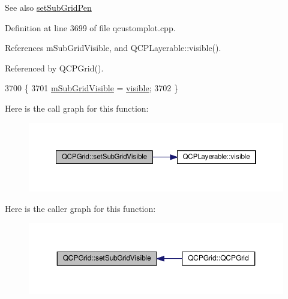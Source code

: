 \begin{DoxySeeAlso}{See also}
\hyperlink{class_q_c_p_grid_a9edd3593f384d1f0b0202a39cef4453d}{set\+Sub\+Grid\+Pen} 
\end{DoxySeeAlso}


Definition at line 3699 of file qcustomplot.\+cpp.



References m\+Sub\+Grid\+Visible, and Q\+C\+P\+Layerable\+::visible().



Referenced by Q\+C\+P\+Grid().


\begin{DoxyCode}
3700 \{
3701   \hyperlink{class_q_c_p_grid_a4e4a0400d6319bb44c06341f6298c87b}{mSubGridVisible} = \hyperlink{class_q_c_p_layerable_a10a3cc92e0fa63e4a929e61d34e275a7}{visible};
3702 \}
\end{DoxyCode}


Here is the call graph for this function\+:\nopagebreak
\begin{figure}[H]
\begin{center}
\leavevmode
\includegraphics[width=350pt]{class_q_c_p_grid_ad4ad6bf714ec45e08845456355a1b700_cgraph}
\end{center}
\end{figure}




Here is the caller graph for this function\+:\nopagebreak
\begin{figure}[H]
\begin{center}
\leavevmode
\includegraphics[width=350pt]{class_q_c_p_grid_ad4ad6bf714ec45e08845456355a1b700_icgraph}
\end{center}
\end{figure}


\hypertarget{class_q_c_p_grid_a209f40fdb252397b418b82d3494d8ea0}{}
